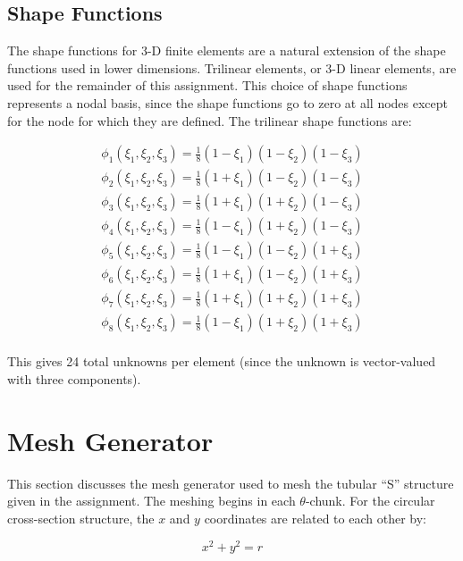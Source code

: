 \documentclass[10pt]{article}
\begin{document}
\subsection{Shape Functions}

The shape functions for 3-D finite elements are a natural extension of the shape functions used in lower dimensions. Trilinear elements, or 3-D linear elements, are used for the remainder of this assignment. This choice of shape functions represents a nodal basis, since the shape functions go to zero at all nodes except for the node for which they are defined. The trilinear shape functions are:

\begin{equation}
\label{eq:Bricks}
\begin{aligned}
\phi_1(\xi_1,\xi_2,\xi_3)=\frac{1}{8}(1-\xi_1)(1-\xi_2)(1-\xi_3)\\
\phi_2(\xi_1,\xi_2,\xi_3)=\frac{1}{8}(1+\xi_1)(1-\xi_2)(1-\xi_3)\\
\phi_3(\xi_1,\xi_2,\xi_3)=\frac{1}{8}(1+\xi_1)(1+\xi_2)(1-\xi_3)\\
\phi_4(\xi_1,\xi_2,\xi_3)=\frac{1}{8}(1-\xi_1)(1+\xi_2)(1-\xi_3)\\
\phi_5(\xi_1,\xi_2,\xi_3)=\frac{1}{8}(1-\xi_1)(1-\xi_2)(1+\xi_3)\\
\phi_6(\xi_1,\xi_2,\xi_3)=\frac{1}{8}(1+\xi_1)(1-\xi_2)(1+\xi_3)\\
\phi_7(\xi_1,\xi_2,\xi_3)=\frac{1}{8}(1+\xi_1)(1+\xi_2)(1+\xi_3)\\
\phi_8(\xi_1,\xi_2,\xi_3)=\frac{1}{8}(1-\xi_1)(1+\xi_2)(1+\xi_3)\\
\end{aligned}
\end{equation}

This gives 24 total unknowns per element (since the unknown is vector-valued with three components). 


\section{Mesh Generator}

This section discusses the mesh generator used to mesh the tubular ``S'' structure given in the assignment. The meshing begins in each \(\theta\)-chunk. For the circular cross-section structure, the \(x\) and \(y\) coordinates are related to each other by:

\begin{equation}
\label{eq:xy}
x^2+y^2=r
\end{equation}
\end{document}
